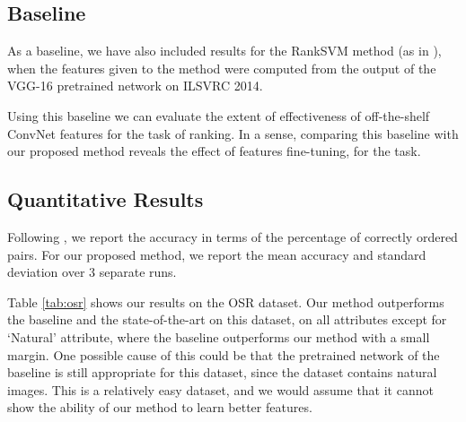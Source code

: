 \documentclass[runningheads]{llncs}
\begin{document}
\subsection{Baseline}

As a baseline, we have also included results for the RankSVM method (as in \cite{parikh2011}), when the features given to the method were computed from the output of the VGG-16 pretrained network on ILSVRC 2014. 

Using this baseline we can evaluate the extent of effectiveness of off-the-shelf ConvNet features \cite{offtheshelf}  for the task of ranking. In a sense, comparing this baseline with our proposed method reveals the effect of features fine-tuning, for the task. 

\subsection{Quantitative Results}

Following \cite{parikh2011,Yu2014,Sandeep_2014_CVPR}, we report the accuracy in terms of the percentage of correctly ordered pairs. For our proposed method, we report the mean accuracy and standard deviation over 3 separate runs. 

Table \ref{tab:osr} shows our results on the OSR dataset. Our method outperforms the baseline and the state-of-the-art on this dataset, on all attributes except for `Natural' attribute, where the baseline outperforms our method with a small margin. One possible cause of this could be that the pretrained network of the baseline is still appropriate for this dataset, since the dataset contains natural images. This is a relatively easy dataset, and we would assume that it cannot show the ability of our method to learn better features.
\end{document}
